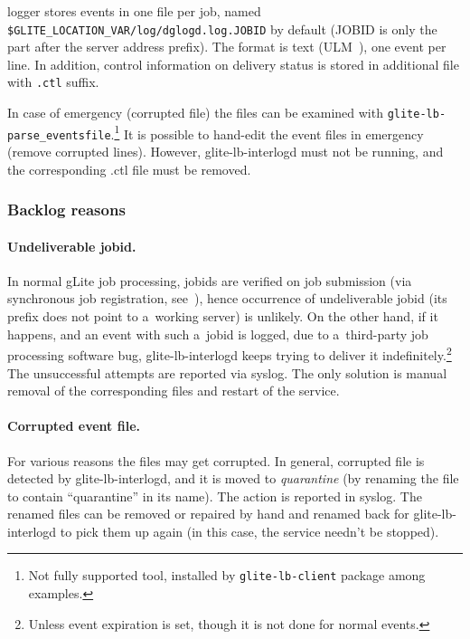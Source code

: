 \LB logger stores events in one file per job, named
\verb'$GLITE_LOCATION_VAR/log/dglogd.log.JOBID' by default
(JOBID is only the part after the \LB server address prefix).
The format is text (ULM~\cite{ulm}), one event per line.
In addition, control information on delivery status is stored in additional
file with \verb'.ctl' suffix.

\begin{sloppypar}
In case of emergency (\eg corrupted file) the files can be examined
with \verb'glite-lb-parse_eventsfile'.\footnote{Not fully supported tool, installed
by \texttt{glite-lb-client} package among examples.}
It is possible to hand-edit the event files in emergency (remove corrupted lines).
However, glite-lb-interlogd must not be running, and the corresponding .ctl file
must be removed.
\end{sloppypar}

\subsubsection{Backlog reasons}

\paragraph{Undeliverable jobid.}
In normal gLite job processing, jobids are verified on job submission
(via synchronous job registration, see~\cite{lbug}), hence occurrence of
undeliverable jobid (\ie its prefix does not point to
a~working \LB server) is unlikely.
On the other hand, if it happens,
and an event with such a~jobid is logged,
\eg due to a~third-party job processing software bug,
glite-lb-interlogd keeps trying to deliver it indefinitely.\footnote{Unless
event expiration is set, though it is not done for normal events.}
The unsuccessful attempts are reported via syslog.
The only solution is manual
removal of the corresponding files
and restart of the service.

\paragraph{Corrupted event file.} 
For various reasons the files may get corrupted.
In general, corrupted file is detected by glite-lb-interlogd, and it is moved
to \emph{quarantine} (by renaming the file to contain ``quarantine'' in its name).
The action is reported in syslog.
The renamed files can be removed or repaired by hand and renamed back
for glite-lb-interlogd to pick them up again
(in this case, the service needn't be stopped).

